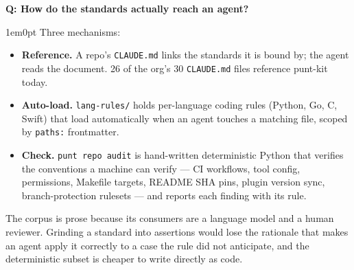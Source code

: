 \documentclass[11pt,letterpaper]{article}
\newcounter{faqnum}
\newenvironment{faqpair}[1]{%
  \needspace{4\baselineskip}%
  \vspace{0.5em}%
  \refstepcounter{faqnum}%
  \noindent\textbf{\color{SectionBlue}Q\thefaqnum: #1}\par\nopagebreak[4]%
  \vspace{0.2em}%
  \begin{adjustwidth}{1em}{0pt}%
  \setlength{\parindent}{0pt}%
}{%
  \end{adjustwidth}%
  \vspace{0.5em}%
}
\begin{document}
\begin{faqpair}{How do the standards actually reach an agent?}\label{faq:standards-mechanism}
  Three mechanisms:

  \begin{itemize}[nosep]
    \item \textbf{Reference.} A repo's \texttt{CLAUDE.md} links the standards it
      is bound by; the agent reads the document. 26 of the org's 30
      \texttt{CLAUDE.md} files reference punt-kit today.
    \item \textbf{Auto-load.} \texttt{lang-rules/} holds per-language coding
      rules (Python, Go, C, Swift) that load automatically when an agent touches
      a matching file, scoped by \texttt{paths:} frontmatter.
    \item \textbf{Check.} \texttt{punt repo audit} is hand-written deterministic
      Python that verifies the conventions a machine can verify --- CI
      workflows, tool config, permissions, Makefile targets, README SHA pins,
      plugin version sync, branch-protection rulesets --- and reports each
      finding with its rule.
  \end{itemize}

  The corpus is prose because its consumers are a language model and a human
  reviewer. Grinding a standard into assertions would lose the rationale that
  makes an agent apply it correctly to a case the rule did not anticipate, and
  the deterministic subset is cheaper to write directly as code.
\end{faqpair}
\end{document}
